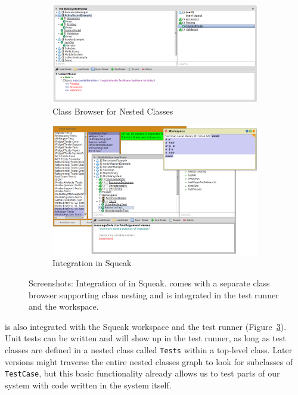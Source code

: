 \begin{figure}[!htp]
	\centering
	\begin{subfigure}[b]{\textwidth}
	\includegraphics[width=\textwidth]{screenshot_classbrowser.png}
	\caption{Class Browser for Nested Classes}
	\label{fig:impl_class_browser}
	\end{subfigure}

	\vspace{20pt}

	\begin{subfigure}[b]{\textwidth}
	\includegraphics[width=\textwidth]{screenshot_integration.png}
	\caption{Integration in Squeak}
	\label{fig:impl_integration}
	\end{subfigure}
	\caption[Screenshots: Integration of \msname in Squeak]{Screenshots: Integration of \msname in Squeak. \msname comes with a separate class browser supporting class nesting and is integrated in the test runner and the workspace.}
\end{figure}

\msname is also integrated with the Squeak workspace and the test runner (Figure~\ref{fig:impl_integration}). Unit tests can be written and will show up in the test runner, as long as test classes are defined in a nested class called \texttt{Tests} within a top-level class. Later versions might traverse the entire nested classes graph to look for subclasses of \texttt{TestCase}, but this basic functionality already allows us to test parts of our system with code written in the system itself.

